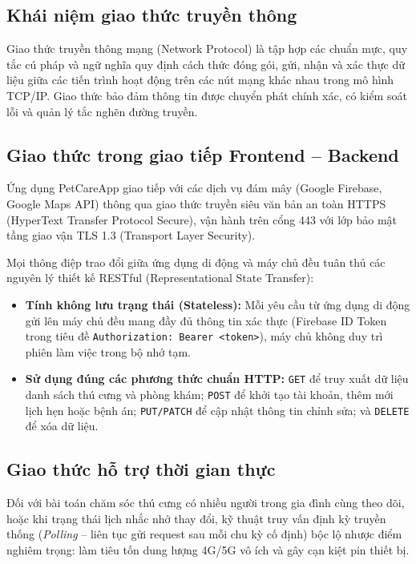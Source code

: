 \subsection{Khái niệm giao thức truyền thông}
\label{subsec:khai_niem_giao_thuc}

Giao thức truyền thông mạng (Network Protocol) là tập hợp các chuẩn mực, quy tắc cú pháp và ngữ nghĩa quy định cách thức đóng gói, gửi, nhận và xác thực dữ liệu giữa các tiến trình hoạt động trên các nút mạng khác nhau trong mô hình TCP/IP. Giao thức bảo đảm thông tin được chuyển phát chính xác, có kiểm soát lỗi và quản lý tắc nghẽn đường truyền.

\subsection{Giao thức trong giao tiếp Frontend -- Backend}
\label{subsec:giao_thuc_frontend_backend}

Ứng dụng PetCareApp giao tiếp với các dịch vụ đám mây (Google Firebase, Google Maps API) thông qua giao thức truyền siêu văn bản an toàn HTTPS (HyperText Transfer Protocol Secure), vận hành trên cổng 443 với lớp bảo mật tầng giao vận TLS 1.3 (Transport Layer Security).

Mọi thông điệp trao đổi giữa ứng dụng di động và máy chủ đều tuân thủ các nguyên lý thiết kế RESTful (Representational State Transfer):
\begin{itemize}
    \item \textbf{Tính không lưu trạng thái (Stateless):} Mỗi yêu cầu từ ứng dụng di động gửi lên máy chủ đều mang đầy đủ thông tin xác thực (Firebase ID Token trong tiêu đề \texttt{Authorization: Bearer <token>}), máy chủ không duy trì phiên làm việc trong bộ nhớ tạm.
    \item \textbf{Sử dụng đúng các phương thức chuẩn HTTP:} \texttt{GET} để truy xuất dữ liệu danh sách thú cưng và phòng khám; \texttt{POST} để khởi tạo tài khoản, thêm mới lịch hẹn hoặc bệnh án; \texttt{PUT/PATCH} để cập nhật thông tin chỉnh sửa; và \texttt{DELETE} để xóa dữ liệu.
\end{itemize}

\subsection{Giao thức hỗ trợ thời gian thực}
\label{subsec:giao_thuc_thoi_gian_thuc}

Đối với bài toán chăm sóc thú cưng có nhiều người trong gia đình cùng theo dõi, hoặc khi trạng thái lịch nhắc nhở thay đổi, kỹ thuật truy vấn định kỳ truyền thống (\textit{Polling} -- liên tục gửi request sau mỗi chu kỳ cố định) bộc lộ nhược điểm nghiêm trọng: làm tiêu tốn dung lượng 4G/5G vô ích và gây cạn kiệt pin thiết bị.

